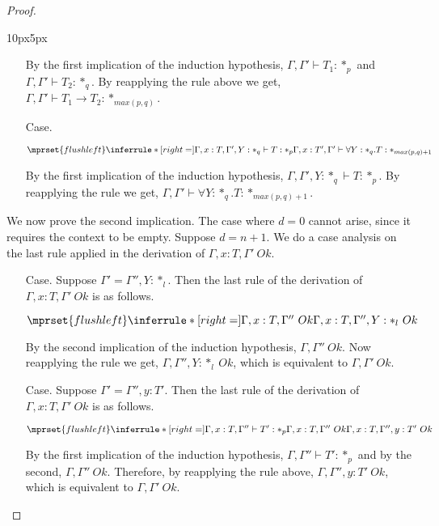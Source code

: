 \begin{proof}
\begin{changemargin}{10px}{5px}
\begin{itemize}
    By the first implication of the induction hypothesis, $\Gamma,\Gamma' \vdash T_1:*_p$ and 
    $\Gamma,\Gamma' \vdash T_2:*_q$.  By reapplying the rule above we get, 
    $\Gamma,\Gamma' \vdash T_1 \rightarrow T_2:*_{max(p,q)}$.
    
  \item[Case.]\ \\
    \begin{center}
      \begin{math}
        $$\mprset{flushleft}
        \inferrule* [right=] {
          \Gamma,x:T,\Gamma',Y:*_q \vdash T : *_p
        }{\Gamma,x:T',\Gamma' \vdash \forall Y:*_q.T : *_{max(p,q)+1}}
      \end{math}
    \end{center}
    By the first implication of the induction hypothesis, $\Gamma,\Gamma',Y:*_q \vdash T:*_p$.
    By reapplying the rule we get, $\Gamma,\Gamma' \vdash \forall Y:*_q.T:*_{max(p,q)+1}$.
  \end{itemize}

  \noindent We now prove the second implication.
  The case where $d = 0$ cannot arise, since it requires the context to be empty.
  Suppose $d = n + 1$.  We do a case analysis on the last rule applied in the derivation of
  $\Gamma,x:T,\Gamma'\ Ok$.
  \begin{itemize}
  \item[Case.]  Suppose $\Gamma' = \Gamma'',Y:*_l$.  Then the last rule of the derivation of
    $\Gamma,x:T,\Gamma'\ Ok$ is as follows.
    \begin{center}
      \begin{math}
        $$\mprset{flushleft}
        \inferrule* [right=] {
          \Gamma,x:T,\Gamma''\ Ok
        }{\Gamma,x:T,\Gamma'',Y:*_l\ Ok}
      \end{math}
    \end{center}
    By the second implication of the induction hypothesis, $\Gamma,\Gamma''\ Ok$.  Now 
    reapplying the rule we get, $\Gamma,\Gamma'',Y:*_l\ Ok$, which is equivalent to 
    $\Gamma,\Gamma'\ Ok$.
    
  \item[Case.]  Suppose $\Gamma' = \Gamma'',y:T'$.  Then the last rule of the derivation of
    $\Gamma,x:T,\Gamma'\ Ok$ is as follows.
    \begin{center}
      \begin{math}
        $$\mprset{flushleft}
        \inferrule* [right=] {
          \Gamma,x:T,\Gamma'' \vdash T':*_p
          \\
          \Gamma,x:T,\Gamma''\ Ok
        }{\Gamma,x:T,\Gamma'',y :T'\ Ok}
      \end{math} 
    \end{center}
    By the first implication of the induction hypothesis, $\Gamma,\Gamma'' \vdash T':*_p$ and 
    by the second, $\Gamma,\Gamma''\ Ok$.
    Therefore, by reapplying the rule above, $\Gamma,\Gamma'',y:T'\ Ok$, which is equivalent 
    to $\Gamma,\Gamma'\ Ok$.
  \end{itemize}
  \end{changemargin}
\end{proof}

